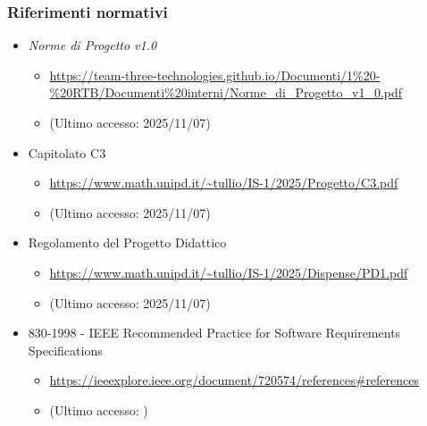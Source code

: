 \documentclass[a4paper,12pt]{article}
\begin{document}
{{            \subsubsection{Riferimenti normativi} {
                \begin{itemize}
                    \item \textit{Norme di Progetto v1.0}
                    \begin{itemize}
                        \item \url{https://team-three-technologies.github.io/Documenti/1%20-%20RTB/Documenti%20interni/Norme_di_Progetto_v1_0.pdf}
                        \item[] (Ultimo accesso: 2025/11/07)
                    \end{itemize}
                    \item Capitolato C3
                    \begin{itemize}
                        \item {\url{https://www.math.unipd.it/~tullio/IS-1/2025/Progetto/C3.pdf}}
                        \item[] (Ultimo accesso: 2025/11/07)
                    \end{itemize}
                    \item Regolamento del Progetto Didattico
                    \begin{itemize}
                        \item \url{https://www.math.unipd.it/~tullio/IS-1/2025/Dispense/PD1.pdf}
                        \item[] (Ultimo accesso: 2025/11/07)
                    \end{itemize}
                    \item 830-1998 - IEEE Recommended Practice for Software Requirements Specifications
                    \begin{itemize}
                        \item \url{https://ieeexplore.ieee.org/document/720574/references#references}
                        \item[] (Ultimo accesso: )
                    \end{itemize}
                \end{itemize}
            }
}}
\end{document}
